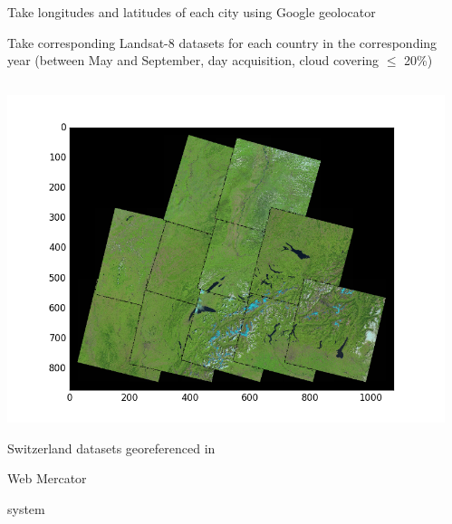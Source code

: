\documentclass[c]{beamer}
\begin{document}
\begin{frame}
\begin{itemize}
{\begin{columns}
\begin{column}{0.33\textwidth}
\begin{table}
\begin{center}
   \end{center}
   \end{table}
  \end{column}
 \end{columns}
 \item Take longitudes and latitudes of each city using Google geolocator
 \item Take corresponding Landsat-8 datasets for each country in the corresponding year (between May and September, day acquisition, cloud covering $\leq$ 20\%)
 \begin{columns}
  \begin{column}{0.33\textwidth}
  \begin{overlayarea}{\linewidth}{3cm}
    \centering\vfill
    \includegraphics[scale=0.20]{images/Switzerland/covering-selection.png}
  \end{overlayarea}
  \begin{overlayarea}{\linewidth}{1cm}
    \centering
    \tiny Switzerland datasets georeferenced in \begin{itshape}Web Mercator\end{itshape} system\par
  \end{overlayarea}
  \end{column}
  \begin{column}{0.33\textwidth}
   \begin{overlayarea}{\linewidth}{3cm}
    \centering\vfill

\end{overlayarea}
\end{column}
\end{columns}}
\end{itemize}
\end{frame}
\end{document}
